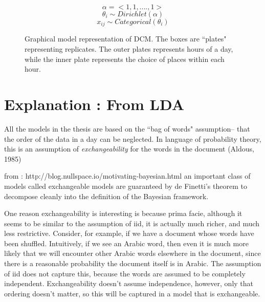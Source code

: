 \documentclass[11pt]{book}
\begin{document}
\noindent
\begin{figure}[htp]

\begin{minipage}{0.3\textwidth}
\centering


\end{minipage}%
\begin{minipage}{0.7\textwidth}

\begin{equation*}
	\alpha = <1, 1, .... , 1 > 
\end{equation*}
\begin{equation*}
	\theta_i  \sim Dirichlet(\alpha)
\end{equation*}
\begin{equation*}
	x_{ij} \sim Categorical(\theta_i)
\end{equation*}
\end{minipage}
\caption{Graphical model representation of DCM. The boxes are ``plates" representing replicates. The outer plates represents hours of a day, while the inner plate represents the choice of places within each hour.}
\label{dcm}
\end{figure}



\section{Explanation : From LDA}
All the models in the thesis are based on the ``bag of words" assumption-- that the order of the data in a day can be neglected.
In language of probability theory, this is an assumption of \emph{exchangeability} for the words in the document (Aldous, 1985)

from : http://blog.nullspace.io/motivating-bayesian.html
an important class of models called exchangeable models are guaranteed by de Finetti’s theorem to decompose cleanly into the definition of the Bayesian framework.

One reason exchangeability is interesting is because prima facie, although it seems to be similar to the assumption of iid, it is actually much richer, and much less restrictive. Consider, for example, if we have a document whose words have been shuffled. Intuitively, if we see an Arabic word, then even it is much more likely that we will encounter other Arabic words elsewhere in the document, since there is a reasonable probability the document itself is in Arabic. The assumption of iid does not capture this, because the words are assumed to be completely independent. Exchangeability doesn’t assume independence, however, only that ordering doesn’t matter, so this will be captured in a model that is exchangeable.
\end{document}
